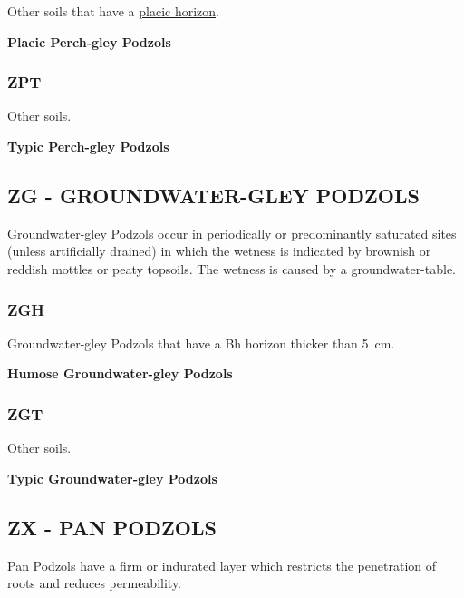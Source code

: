 \documentclass[
  letterpaper,
  DIV=11,
  numbers=noendperiod]{scrreprt}
\begin{document}
Other soils that have a \protect\hyperlink{sec-diag-plac}{placic
horizon}.

\textbf{Placic Perch-gley Podzols}

\hypertarget{sec-key-ZPT}{%
\subsubsection{\texorpdfstring{\textbf{ZPT}}{ZPT}}\label{sec-key-ZPT}}

Other soils.

\textbf{Typic Perch-gley Podzols}

\hypertarget{sec-ZG}{%
\subsection{\texorpdfstring{\textbf{ZG} - GROUNDWATER-GLEY
PODZOLS}{ZG - GROUNDWATER-GLEY PODZOLS}}\label{sec-ZG}}

Groundwater-gley Podzols occur in periodically or predominantly
saturated sites (unless artificially drained) in which the wetness is
indicated by brownish or reddish mottles or peaty topsoils. The wetness
is caused by a groundwater-table.

\hypertarget{sec-key-ZGH}{%
\subsubsection{\texorpdfstring{\textbf{ZGH}}{ZGH}}\label{sec-key-ZGH}}

Groundwater-gley Podzols that have a Bh horizon thicker than 5~cm.

\textbf{Humose Groundwater-gley Podzols}

\hypertarget{sec-key-ZGT}{%
\subsubsection{\texorpdfstring{\textbf{ZGT}}{ZGT}}\label{sec-key-ZGT}}

Other soils.

\textbf{Typic Groundwater-gley Podzols}

\hypertarget{sec-ZX}{%
\subsection{\texorpdfstring{\textbf{ZX} - PAN
PODZOLS}{ZX - PAN PODZOLS}}\label{sec-ZX}}

Pan Podzols have a firm or indurated layer which restricts the
penetration of roots and reduces permeability.
\end{document}
